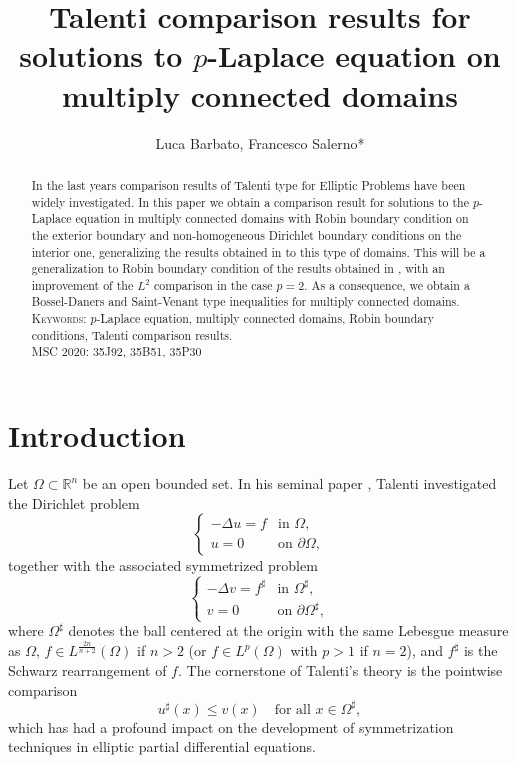 \documentclass[12pt]{article}
\title{Talenti comparison results for solutions to $p$-Laplace equation on multiply connected domains}
\author{Luca Barbato, Francesco Salerno*}
\date{}
\theoremstyle{definition}
\theoremstyle{plain}
\theoremstyle{definition}
\begin{document}
\maketitle

\begin{abstract}

In the last years comparison results of Talenti type for Elliptic Problems have been widely investigated. In this paper we obtain a comparison result for solutions to the $p$-Laplace equation in multiply connected domains with Robin boundary condition on the exterior boundary and non-homogeneous Dirichlet boundary conditions on the interior one, generalizing the results obtained in \cite{ANT, AGM} to this type of domains. This will be a generalization to Robin boundary condition of the results obtained in \cite{B, B2}, with an improvement of the $L^2$ comparison in the case $p=2$. As a consequence, we obtain a Bossel-Daners and Saint-Venant type inequalities for multiply connected domains.  
\newline
\newline
\textsc{Keywords:} $p$-Laplace equation, multiply connected domains, Robin boundary conditions, Talenti comparison results.  \\
\textsc{MSC 2020:}  35J92, 35B51, 35P30
\end{abstract}
\section{Introduction}
Let $\Omega \subset \mathbb{R}^n$ be an open bounded set. In his seminal paper \cite{T76}, Talenti investigated the Dirichlet problem
\begin{equation*}
    \begin{cases}
        -\Delta u = f & \text{in } \Omega,\\
        u = 0 & \text{on } \partial \Omega,
    \end{cases}
\end{equation*}
together with the associated symmetrized problem
\begin{equation*}
    \begin{cases}
        -\Delta v = f^\sharp & \text{in } \Omega^\sharp,\\
        v = 0 & \text{on } \partial \Omega^\sharp,
    \end{cases}
\end{equation*}
where $\Omega^\sharp$ denotes the ball centered at the origin with the same Lebesgue measure as $\Omega$, $f \in L^{\frac{2n}{n+2}}(\Omega)$ if $n>2$ (or $f \in L^p(\Omega)$ with $p>1$ if $n=2$), and $f^\sharp$ is the Schwarz rearrangement of $f$.  
The cornerstone of Talenti’s theory is the pointwise comparison
\begin{equation*}
    u^\sharp(x) \leq v(x) \quad \text{for all } x \in \Omega^\sharp,
\end{equation*}
which has had a profound impact on the development of symmetrization techniques in elliptic partial differential equations.
\end{document}
